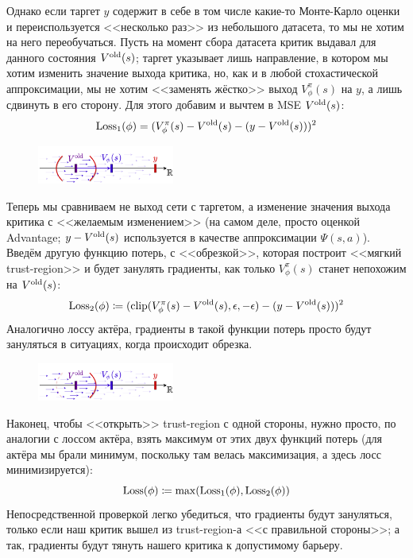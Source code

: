 Однако если таргет $y$ содержит в себе в том числе какие-то Монте-Карло оценки и переиспользуется <<несколько раз>> из небольшого датасета, то мы не хотим на него переобучаться. Пусть на момент сбора датасета критик выдавал для данного состояния $V^{\mathrm{old}}(s)$; таргет указывает лишь направление, в котором мы хотим изменить значение выхода критика, но, как и в любой стохастической аппроксимации, мы не хотим <<заменять жёстко>> выход $V^{\pi}_{\phi}(s)$ на $y$, а лишь сдвинуть в его сторону. Для этого добавим и вычтем в MSE $V^{\mathrm{old}}(s)$:
$$\operatorname{Loss}_1(\phi) = (V^{\pi}_{\phi}(s) - V^{\mathrm{old}}(s) - (y - V^{\mathrm{old}}(s)))^2$$

\begin{figure}
\centering
\includegraphics[width=0.4\textwidth]{Images/ValueTrustRegion2.png}
\end{figure}
Теперь мы сравниваем не выход сети с таргетом, а изменение значения выхода критика с <<желаемым изменением>> (на самом деле, просто оценкой Advantage; $y - V^{\mathrm{old}}(s)$ используется в качестве аппроксимации $\Psi(s, a)$). Введём другую функцию потерь, с <<обрезкой>>, которая построит <<мягкий trust-region>> и будет занулять градиенты, как только $V^{\pi}_{\phi}(s)$ станет непохожим на $V^{\mathrm{old}}(s)$:
$$\operatorname{Loss}_2(\phi) \coloneqq (\mathrm{clip}(V^{\pi}_{\phi}(s) - V^{\mathrm{old}}(s), \epsilon, -\epsilon) - (y - V^{\mathrm{old}}(s)))^2$$
Аналогично лоссу актёра, градиенты в такой функции потерь просто будут зануляться в ситуациях, когда происходит обрезка.

\begin{figure}
\vspace{-0.7cm}
\centering
\includegraphics[width=0.4\textwidth]{Images/ValueTrustRegion3.png}
\end{figure}
Наконец, чтобы <<открыть>> trust-region с одной стороны, нужно просто, по аналогии с лоссом актёра, взять максимум от этих двух функций потерь (для актёра мы брали минимум, поскольку там велась максимизация, а здесь лосс минимизируется):
$$\operatorname{Loss}(\phi) \coloneqq \max(\operatorname{Loss}_1(\phi), \operatorname{Loss}_2(\phi))$$
Непосредственной проверкой легко убедиться, что градиенты будут зануляться, только если наш критик вышел из trust-region-а <<с правильной стороны>>; а так, градиенты будут тянуть нашего критика к допустимому барьеру.

